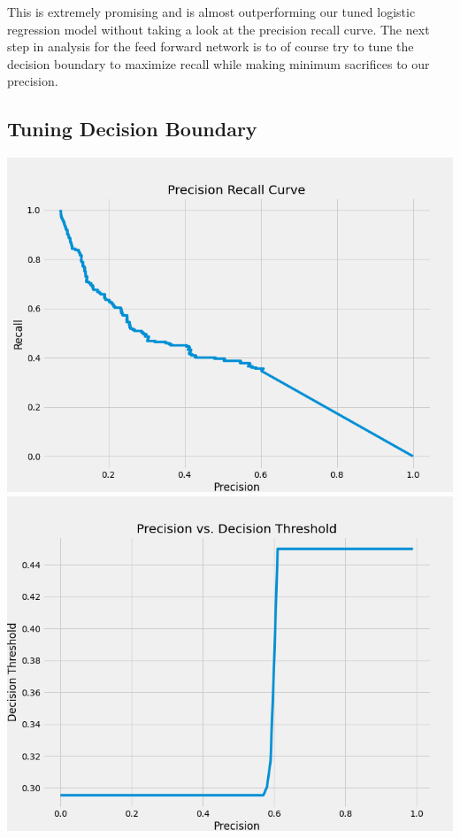 \documentclass[12pt]{article}
\begin{document}
	This is extremely promising and is almost outperforming our tuned logistic regression model without taking a look at the precision recall curve. The next step in analysis for the feed forward network is to of course try to tune the decision boundary to maximize recall while making minimum sacrifices to our precision. 
	
	\subsection{Tuning Decision Boundary }
	
	\begin{center}
		\includegraphics[scale=0.3]{../notebooks/pr_curve_nn.png}
		\includegraphics[scale=0.3]{../notebooks/precisionvsthreshold_nn.png}
	\end{center}
	
\end{document}
